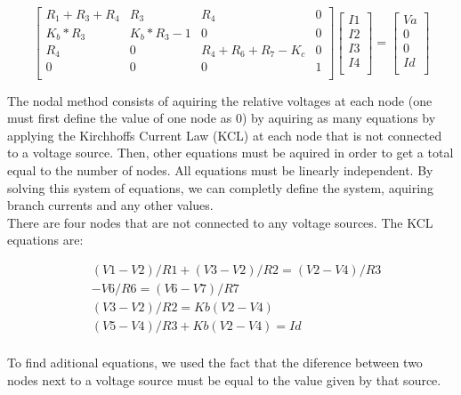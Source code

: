 $$
\begin{bmatrix} 
	R_1+R_3+R_4 & R_3       & R_4             & 0 \\       
	K_b*R_3     & K_b*R_3-1 & 0               & 0 \\
	R_4         &     0     & R_4+R_6+R_7-K_c & 0 \\
	0           & 0         & 0               & 1 \\
\end {bmatrix} 
\begin{bmatrix} 
	I1 \\       
	I2 \\
	I3 \\
	I4 \\
\end {bmatrix} 
=
\begin{bmatrix} 
	Va \\       
	0  \\
	0  \\
	Id \\
\end {bmatrix} 
$$











\quad

The nodal method consists of aquiring the relative voltages at each node (one must first define the value of one node as 0) by aquiring as many equations by applying the Kirchhoffs Current Law (KCL) at each node that is not connected to a voltage source. Then, other equations must be aquired in order to get a total equal to the number of nodes. All equations must be linearly independent. By solving this system of equations, we can completly define the system, aquiring branch currents and any other values.\\

There are four nodes that are not connected to any voltage sources. The KCL equations are: 

\begin{align*} 
&(V1-V2)/R1+(V3-V2)/R2 = (V2-V4)/R3 \\ 
&-V6/R6 = (V6-V7)/R7\\
&(V3-V2)/R2 = Kb(V2-V4) \\
&(V5-V4)/R3+Kb(V2-V4) = Id \\
\end{align*}

 
To find aditional equations, we used the fact that the diference between two nodes next to a voltage source must be equal to the value given by that source. 

